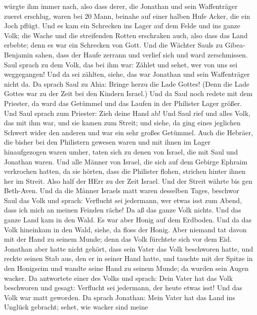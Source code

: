 würgte ihm immer nach,  also dass derer, die Jonathan und
sein Waffenträger zuerst erschlug, waren bei 20 Mann, beinahe auf einer
halben Hufe Acker, die ein Joch pflügt.  Und es kam ein
Schrecken ins Lager auf dem Felde und ins ganze Volk; die Wache und die
streifenden Rotten erschraken auch, also dass das Land erbebte; denn es
war ein Schrecken von Gott.  Und die Wächter Sauls zu
Gibea-Benjamin sahen, dass der Haufe zerrann und verlief sich und ward
zerschmissen.  Saul sprach zu dem Volk, das bei ihm war:
Zählet und sehet, wer von uns sei weggegangen! Und da sei zählten,
siehe, das war Jonathan und sein Waffenträger nicht da.  Da
sprach Saul zu Ahia: Bringe herzu die Lade Gottes! (Denn die Lade Gottes
war zu der Zeit bei den Kindern Israel.)  Und da Saul noch
redete mit dem Priester, da ward das Getümmel und das Laufen in der
Philister Lager größer. Und Saul sprach zum Priester: Zieh deine Hand
ab!  Und Saul rief und alles Volk, das mit ihm war, und sie
kamen zum Streit; und siehe, da ging eines jeglichen Schwert wider den
anderen und war ein sehr großes Getümmel.  Auch die
Hebräer, die bisher bei den Philistern gewesen waren und mit ihnen im
Lager hinaufgezogen waren umher, taten sich zu denen von Israel, die mit
Saul und Jonathan waren.  Und alle Männer von Israel, die
sich auf dem Gebirge Ephraim verkrochen hatten, da sie hörten, dass die
Philister flohen, strichen hinter ihnen her im Streit. 
Also half der HErr zu der Zeit Israel. Und der Streit währte bis gen
Beth-Aven.  Und da die Männer Israels matt waren desselben
Tages, beschwor Saul das Volk und sprach: Verflucht sei jedermann, wer
etwas isst zum Abend, dass ich mich an meinen Feinden räche! Da aß das
ganze Volk nichts.  Und das ganze Land kam in den Wald. Es
war aber Honig auf dem Erdboden.  Und da das Volk hineinkam
in den Wald, siehe, da floss der Honig. Aber niemand tat davon mit der
Hand zu seinem Munde; denn das Volk fürchtete sich vor dem Eid.
 Jonathan aber hatte nicht gehört, dass sein Vater das Volk
beschworen hatte, und reckte seinen Stab aus, den er in seiner Hand
hatte, und tauchte mit der Spitze in den Honigseim und wandte seine Hand
zu seinem Munde; da wurden sein Augen wacker.  Da
antwortete einer des Volks und sprach: Dein Vater hat das Volk
beschworen und gesagt: Verflucht sei jedermann, der heute etwas isst!
Und das Volk war matt geworden.  Da sprach Jonathan: Mein
Vater hat das Land ins Unglück gebracht; sehet, wie wacker sind meine

